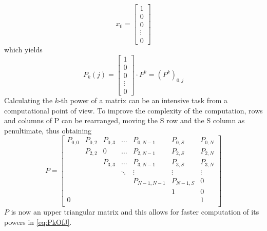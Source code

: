\begin{equation*}
x_{0} = 
\begin{bmatrix}
1 \\
0 \\
0 \\
\vdots \\
0
\end{bmatrix}
\label{initialStateVector}
\end{equation*}
which yields
\begin{equation}
P_{k}(j) = 
\begin{bmatrix}
1 \\
0 \\
0 \\
\vdots \\
0
\end{bmatrix}
\cdot P^{k} = (P^{k})_{0,j}
\label{eq:PkOfJ}
\end{equation}
Calculating the $k$-th power of a matrix can be an intensive task from a
computational point of view. To improve the complexity of the computation, rows
and columns of P can be rearranged, moving the S row and the S column as
penultimate, thus obtaining
\begin{equation*}
P = 
\begin{bmatrix}
P_{0,0}	& P_{0,2}	& P_{0,3}  	& \dots	& P_{0, N-1}	& P_{0,S}	& P_{0,N} \\
		& P_{2,2}	& 0  	& \dots	& P_{2, N-1}	& P_{2,S}	& P_{2,N} \\
		& 			& P_{3,3}	& \dots	& P_{3, N-1}	& P_{3,S}	& P_{3,N} \\
 		& 			& 			& \ddots& \vdots		& \vdots	& \vdots \\
		& 			& 			& 		& P_{N-1,N-1}	& P_{N-1,S}	& 0\\
		& 			& 			& 		& 				& 1			& 0		 \\
0		& 			& 		  	& 		& 				& 			& 1		 \\
\end{bmatrix}
\label{triangularPMatrix}
\end{equation*}
$P$ is now an upper triangular matrix and this allows for faster computation of
its powers in \ref{eq:PkOfJ}.
